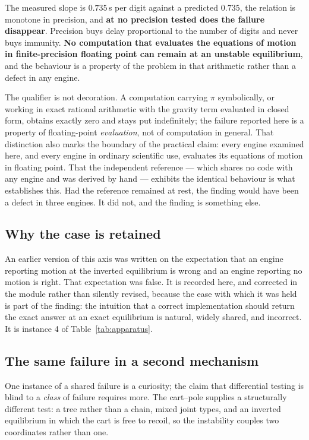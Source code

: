 \documentclass[review,12pt]{elsarticle}
\begin{document}
\noindent The measured slope is $0.735$\,s per digit against a predicted $0.735$, the
relation is monotone in precision, and \textbf{at no precision tested does the
failure disappear}. Precision buys delay proportional to the number of digits
and never buys immunity. \textbf{No computation that evaluates the equations of
motion in finite-precision floating point can remain at an unstable
equilibrium}, and the behaviour is a property of the problem in that arithmetic
rather than a defect in any engine.

The qualifier is not decoration. A computation carrying $\pi$ symbolically, or
working in exact rational arithmetic with the gravity term evaluated in closed
form, obtains exactly zero and stays put indefinitely; the failure reported
here is a property of floating-point \emph{evaluation}, not of computation in
general. That distinction also marks the boundary of the practical claim: every
engine examined here, and every engine in ordinary scientific use, evaluates
its equations of motion in floating point. That the independent reference --- which shares no code
with any engine and was derived by hand --- exhibits the identical behaviour is
what establishes this. Had the reference remained at rest, the finding would
have been a defect in three engines. It did not, and the finding is something
else.

\subsection{Why the case is retained}
An earlier version of this axis was written on the expectation that an engine
reporting motion at the inverted equilibrium is wrong and an engine reporting no
motion is right. That expectation was false. It is recorded here, and corrected
in the module rather than silently revised, because the ease with which it was
held is part of the finding: the intuition that a correct implementation should
return the exact answer at an exact equilibrium is natural, widely shared, and
incorrect. It is instance 4 of Table~\ref{tab:apparatus}.

\subsection{The same failure in a second mechanism}
One instance of a shared failure is a curiosity; the claim that differential
testing is blind to a \emph{class} of failure requires more. The cart--pole
supplies a structurally different test: a tree rather than a chain, mixed joint
types, and an inverted equilibrium in which the cart is free to recoil, so the
instability couples two coordinates rather than one.
\end{document}
